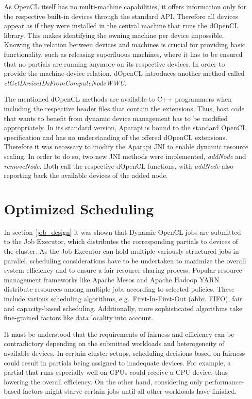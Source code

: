 As OpenCL itself has no multi-machine capabilities, it offers information only for the respective built-in devices through the standard API. Therefore all devices appear as if they were installed in the central machine that runs the dOpenCL library. This makes identifying the owning machine per device impossible. Knowing the relation between devices and machines is crucial for providing basic functionality, such as releasing superfluous machines, where it has to be ensured that no partials are running anymore on its respective devices. In order to provide the machine-device relation, dOpenCL introduces another method called \textit{clGetDeviceIDsFromComputeNodeWWU}.

The mentioned dOpenCL methods are available to C++ programmers when including the respective header files that contain the extensions. Thus, host code that wants to benefit from dynamic device management has to be modified appropriately. In its standard version, Aparapi is bound to the standard OpenCL specification and has no understanding of the offered dOpenCL extensions. Therefore it was necessary to modify the Aparapi JNI to enable dynamic resource scaling. In order to do so, two new JNI methods were implemented, \textit{addNode} and \textit{removeNode}. Both call the respective dOpenCL functions, with \textit{addNode} also reporting back the available devices of the added node.

\section{Optimized Scheduling}
\label{optimized_scheduling}
In section \ref{job_design} it was shown that Dynamic OpenCL jobs are submitted to the Job Executor, which distributes the corresponding partials to devices of the cluster. As the Job Executor can hold multiple variously structured jobs in parallel, scheduling considerations have to be undertaken to maximize the overall system efficiency and to ensure a fair resource sharing process. Popular resource management frameworks like Apache Mesos and Apache Hadoop YARN distribute resources among multiple jobs according to selected policies\cite{mesos}\cite{yarn_paper}. These include various scheduling algorithms, e.g.~First-In-First-Out (abbr. FIFO), fair and capacity-based scheduling. Additionally, more sophisticated algorithms take fine-grained factors like data locality into account.

It must be understood that the requirements of fairness and efficiency can be contradictory depending on the submitted workloads and heterogeneity of available devices. In certain cluster setups, scheduling decisions based on fairness could result in partials being assigned to inadequate devices. For example, a partial that runs especially well on GPUs could receive a CPU device, thus lowering the overall efficiency. On the other hand, considering only performance-based factors might starve certain jobs until all other workloads have finished.

